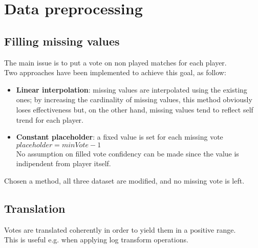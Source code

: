 \chapter {Data preprocessing}

\section{Filling missing values}

The main issue is to put a vote on non played matches for each player.
\\
Two approaches have been implemented to achieve this goal, as follow:
\begin{itemize}
\item \textbf{Linear interpolation}: missing values are interpolated using the existing ones; by increasing the cardinality of missing values, this method obviously loses effectiveness but, on the other hand, missing values tend to reflect self trend for each player.  
\item \textbf{Constant placeholder}: a fixed value is set for each missing vote 
\\
$placeholder = minVote - 1$
\\
No assumption on filled vote confidency can be made since the value is indipendent from player itself.
\end{itemize}

Chosen a method, all three dataset are modified, and no missing vote is left.

\section{Translation}

Votes are translated coherently in order to yield them in a positive range.
\\
This is useful e.g. when applying log transform operations. 

